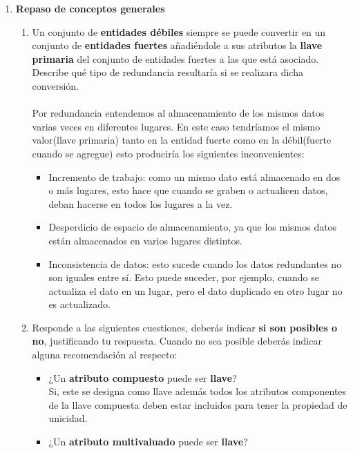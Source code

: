 \documentclass{article}
\author{Flores González Luis Brandon - 312218342 \\ García Argueta Jaime Daniel - 312104739 \\ Tarea 2. Modelo Entidad – Relación}
\title{}
\date{01 de marzo de 2017}
\begin{document}
	\maketitle	
	
	\begin{enumerate}
		\item \textbf{Repaso de conceptos generales}
			\begin{enumerate}
				\item Un conjunto de \textbf{entidades débiles} siempre se puede convertir en un conjunto de \textbf{entidades fuertes}
				añadiéndole a sus atributos la \textbf{llave primaria} del conjunto de entidades fuertes a las que está
				asociado. Describe qué tipo de redundancia resultaría si se realizara dicha conversión.
				\\\\Por redundancia entendemos al almacenamiento de los mismos datos varias veces en diferentes lugares. En este caso tendríamos el mismo valor(llave primaria) tanto en la entidad fuerte como en la débil(fuerte cuando se agregue) esto produciría los siguientes inconvenientes:
					\begin{itemize}
						\item Incremento de trabajo: como un mismo dato está almacenado en dos o más lugares, esto hace que cuando se graben o actualicen datos, deban hacerse en todos los lugares a la vez.
						\item Desperdicio de espacio de almacenamiento, ya que los mismos datos están almacenados en varios lugares distintos.
						\item Inconsistencia de datos: esto sucede cuando los datos redundantes no son iguales entre sí. Esto puede suceder, por ejemplo, cuando se actualiza el dato en un lugar, pero el dato duplicado en otro lugar no es actualizado.\\
					\end{itemize}
				\item Responde a las siguientes cuestiones, deberás indicar \textbf{si son posibles o no}, justificando tu
				respuesta. Cuando no sea posible deberás indicar alguna recomendación al respecto:
				\begin{itemize}
					\item ¿Un \textbf{atributo compuesto} puede ser \textbf{llave}?
					\\Si, este se designa como llave además todos los atributos componentes de la llave compuesta deben estar incluidos para tener la propiedad de unicidad. 
					\item ¿Un \textbf{atributo multivaluado} puede ser \textbf{llave}? 

\end{itemize}
\end{enumerate}
\end{enumerate}
\end{document}
